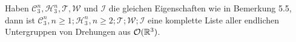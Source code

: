 \begin{theorem}
 Haben $\mathcal{C}^n_3,\mathcal{H}^n_3,\mathcal{T},\mathcal{W}$ und $\mathcal{I}$ die gleichen Eigenschaften wie in Bemerkung 5.5, dann ist $\mathcal{C}^n_3,n\geq1;\mathcal{H}^n_3,n\geq2;\mathcal{T};\mathcal{W};\mathcal{I}$ eine komplette Liste aller endlichen Untergruppen von Drehungen aus ${\mathcal{O}(\mathbb{R}^3)}$.
\end{theorem}



